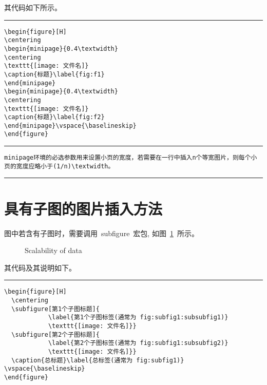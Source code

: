 其代码如下所示。
\vspace{1em}\noindent\hrule
\begin{verbatim}
\begin{figure}[H]
\centering
\begin{minipage}{0.4\textwidth}
\centering
\texttt{[image: 文件名]}
\caption{标题}\label{fig:f1}
\end{minipage}
\begin{minipage}{0.4\textwidth}
\centering
\texttt{[image: 文件名]}
\caption{标题}\label{fig:f2}
\end{minipage}\vspace{\baselineskip}
\end{figure}
\end{verbatim}

\noindent\hrule

\begin{verbatim}
minipage环境的必选参数用来设置小页的宽度，若需要在一行中插入n个等宽图片，则每个小页的宽度应略小于(1/n)\textwidth。
\end{verbatim}

\noindent\hrule

\section{具有子图的图片插入方法}

图中若含有子图时，需要调用~subfigure~宏包, 如图~\ref{fig:subfig}~所示。
\begin{figure}[H]
  \centering
  \caption{Scalability of data}\label{fig:subfig}
\vspace{\baselineskip}
\end{figure}

其代码及其说明如下。
\vspace{1em}\noindent\hrule

\begin{verbatim}
\begin{figure}[H]
  \centering
  \subfigure[第1个子图标题]{
            \label{第1个子图标签(通常为 fig:subfig1:subsubfig1)}
            \texttt{[image: 文件名]}}
  \subfigure[第2个子图标题]{
            \label{第2个子图标签(通常为 fig:subfig1:subsubfig2)}
            \texttt{[image: 文件名]}}
  \caption{总标题}\label{总标签(通常为 fig:subfig1)}
\vspace{\baselineskip}
\end{figure}
\end{verbatim}

